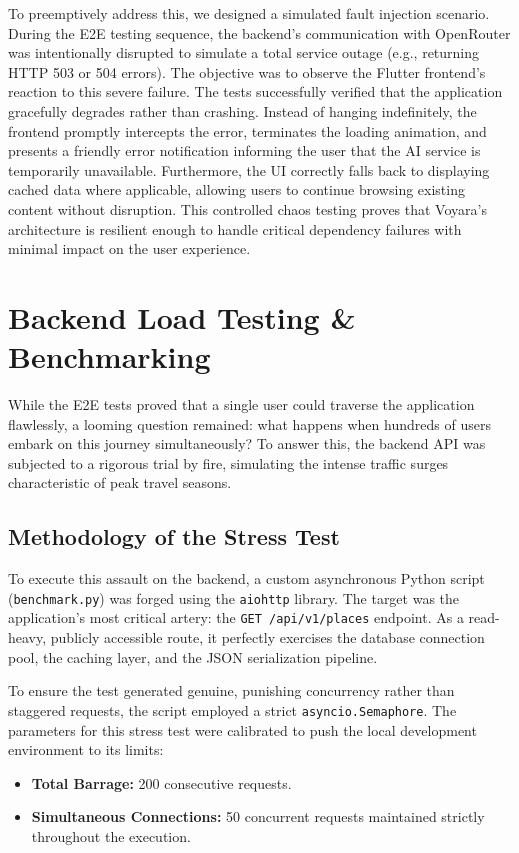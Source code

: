 To preemptively address this, we designed a simulated fault injection scenario. During the E2E testing sequence, the backend's communication with OpenRouter was intentionally disrupted to simulate a total service outage (e.g., returning HTTP 503 or 504 errors). The objective was to observe the Flutter frontend's reaction to this severe failure. The tests successfully verified that the application gracefully degrades rather than crashing. Instead of hanging indefinitely, the frontend promptly intercepts the error, terminates the loading animation, and presents a friendly error notification informing the user that the AI service is temporarily unavailable. Furthermore, the UI correctly falls back to displaying cached data where applicable, allowing users to continue browsing existing content without disruption. This controlled chaos testing proves that Voyara's architecture is resilient enough to handle critical dependency failures with minimal impact on the user experience.

\section{Backend Load Testing \& Benchmarking}
While the E2E tests proved that a single user could traverse the application flawlessly, a looming question remained: what happens when hundreds of users embark on this journey simultaneously? To answer this, the backend API was subjected to a rigorous trial by fire, simulating the intense traffic surges characteristic of peak travel seasons.

\subsection{Methodology of the Stress Test}
To execute this assault on the backend, a custom asynchronous Python script (\texttt{benchmark.py}) was forged using the \texttt{aiohttp} library. The target was the application's most critical artery: the \texttt{GET /api/v1/places} endpoint. As a read-heavy, publicly accessible route, it perfectly exercises the database connection pool, the caching layer, and the JSON serialization pipeline. 

To ensure the test generated genuine, punishing concurrency rather than staggered requests, the script employed a strict \texttt{asyncio.Semaphore}. The parameters for this stress test were calibrated to push the local development environment to its limits:
\begin{itemize}
    \item \textbf{Total Barrage:} 200 consecutive requests.
    \item \textbf{Simultaneous Connections:} 50 concurrent requests maintained strictly throughout the execution.
\end{itemize}

